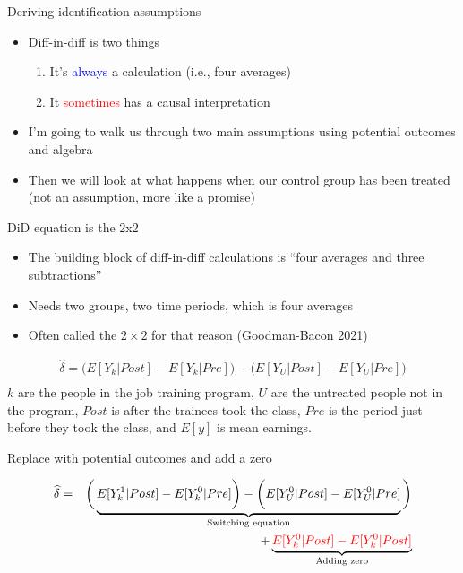 \documentclass{beamer}
\begin{document}
\begin{frame}{Deriving identification assumptions}

\begin{itemize}

\item Diff-in-diff is two things 
	\begin{enumerate}
	\item It's \textcolor{blue}{always} a calculation (i.e., four averages)
	\item It \textcolor{red}{sometimes} has a causal interpretation
	\end{enumerate}
\item I'm going to walk us through two main assumptions using potential outcomes and algebra
\item Then we will look at what happens when our control group has been treated (not an assumption, more like a promise)
\end{itemize}

\end{frame}


\begin{frame}{DiD equation is the 2x2}

\begin{itemize}
\item The building block of diff-in-diff calculations is ``four averages and three subtractions''
\item Needs two groups, two time periods, which is four averages
\item Often called the $2 \times 2$ for that reason (Goodman-Bacon 2021)
\end{itemize}

\begin{eqnarray*}
\widehat{\delta} = \bigg ( E[Y_k|Post] - E[Y_k|Pre] \bigg ) - \bigg ( E[Y_U | Post ] - E[ Y_U | Pre] \bigg) \\
\end{eqnarray*}$k$ are the people in the job training program, $U$ are the untreated people not in the program, $Post$ is after the trainees took the class, $Pre$ is the period just before they took the class, and $E[y]$ is mean earnings. 

\end{frame}



\begin{frame}{Replace with potential outcomes and add a zero}

\begin{eqnarray*}
\widehat{\delta} &=& \bigg ( \underbrace{E[Y^1_k|Post] - E[Y^0_k|Pre] \bigg ) - \bigg ( E[Y^0_U | Post ] - E[ Y^0_U | Pre]}_{\mathclap{\text{Switching equation}}} \bigg)  \\
&&+ \underbrace{\textcolor{red}{E[Y_k^0 |Post] - E[Y^0_k | Post]}}_{\mathclap{\text{Adding zero}}} 
\end{eqnarray*}

\end{frame}
\end{document}
